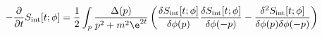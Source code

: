 \begin{equation}
- \frac{\partial}{\partial t} S_{\text{int}} [t; \phi] = \frac{1}{2}
  \int_p \frac{\Delta (p)}{p^2 + m^2 \e^{2t}} \left( \frac{\delta
  S_{\text{int}}[t;\phi]}{\delta \phi (p)} \frac{\delta S_{\text{int}}
  [t;\phi]}{\delta \phi (-p)} - \frac{\delta^2 S_{\text{int}}
  [t;\phi]}{\delta \phi (p) \delta \phi (-p)} \right)
\end{equation}

